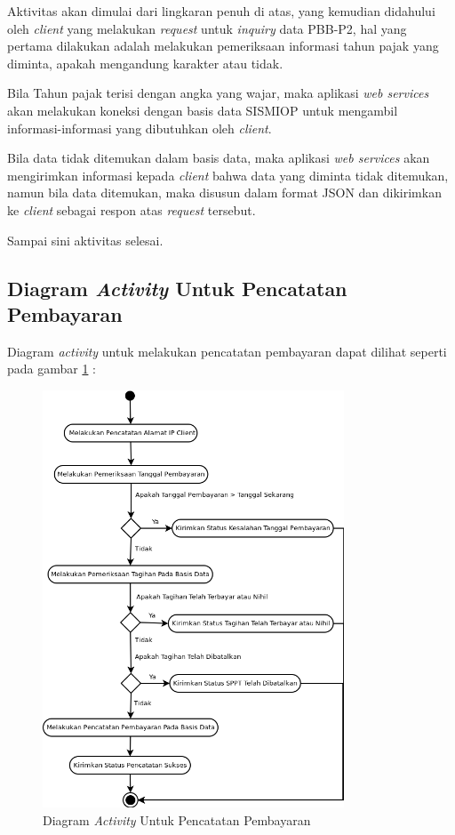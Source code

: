 Aktivitas akan dimulai dari lingkaran penuh di atas, yang kemudian didahului oleh \textit{client} yang melakukan \textit{request} untuk \textit{inquiry} data PBB-P2, hal yang pertama dilakukan adalah melakukan pemeriksaan informasi tahun pajak yang diminta, apakah mengandung karakter atau tidak.

Bila Tahun pajak terisi dengan angka yang wajar, maka aplikasi \textit{web services} akan melakukan koneksi dengan basis data SISMIOP untuk mengambil informasi-informasi yang dibutuhkan oleh \textit{client}.

Bila data tidak ditemukan dalam basis data, maka aplikasi \textit{web services} akan mengirimkan informasi kepada \textit{client} bahwa data yang diminta tidak ditemukan, namun bila data ditemukan, maka disusun dalam format JSON dan dikirimkan ke \textit{client} sebagai respon atas \textit{request} tersebut.

Sampai sini aktivitas selesai.

\subsection{Diagram \textit{Activity} Untuk Pencatatan Pembayaran}

Diagram \textit{activity} untuk melakukan pencatatan pembayaran dapat dilihat seperti pada gambar \ref{fig:act-bayar} :

\begin{figure}[H]
  \centering
  \includegraphics[width=0.8\textwidth]{./resources/uml/uml-act-bayar}
  \caption{Diagram \textit{Activity} Untuk Pencatatan Pembayaran}
  \label{fig:act-bayar}
\end{figure}

